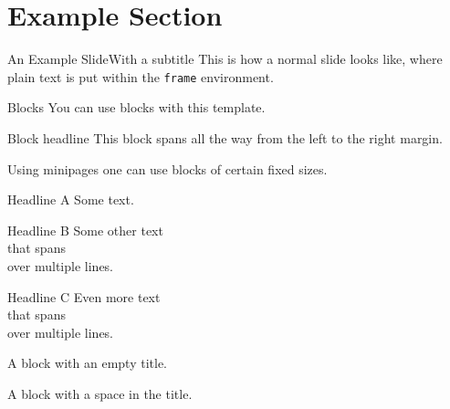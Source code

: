 %
%
%

\section{Example Section}
\begin{frame}[t]{An Example Slide}{With a subtitle}
This is how a normal slide looks like, where plain text is put within the \texttt{frame} environment.
\end{frame}
%
%
%
%
%
\begin{frame}[t]{Blocks}{}
You can use blocks with this template.
\begin{block}{Block headline}
This block spans all the way from the left to the right margin.
\end{block}
Using minipages one can use blocks of certain fixed sizes.\\
%
\noindent%
\begin{minipage}[t]{0.45\textwidth}
\begin{block}{Headline A}
Some text.
\end{block}
\end{minipage}
\hfill%
\begin{minipage}[t]{0.2\textwidth}
\begin{block}{Headline B}
Some other text\\
that spans\\
over multiple lines.
\end{block}
\end{minipage}
\hfill%
\begin{minipage}[t]{0.2\textwidth}
\begin{block}{Headline C}
Even more text\\
that spans\\
over multiple lines.
\end{block}
\end{minipage}

\begin{block}{}
A block with an empty title.
\end{block}

\begin{block}{ }
A block with a space in the title.
\end{block}
\end{frame}
